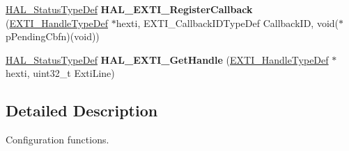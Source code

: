 \begin{DoxyCompactItemize}
\mbox{\hyperlink{stm32f7xx__hal__def_8h_a63c0679d1cb8b8c684fbb0632743478f}{H\+A\+L\+\_\+\+Status\+Type\+Def}} {\bfseries H\+A\+L\+\_\+\+E\+X\+T\+I\+\_\+\+Register\+Callback} (\mbox{\hyperlink{struct_e_x_t_i___handle_type_def}{E\+X\+T\+I\+\_\+\+Handle\+Type\+Def}} $\ast$hexti, E\+X\+T\+I\+\_\+\+Callback\+I\+D\+Type\+Def Callback\+ID, void($\ast$p\+Pending\+Cbfn)(void))
\item 
\mbox{\label{group___e_x_t_i___exported___functions___group1_gaa5856ee92dc1265db144af025673ee46}} 
\mbox{\hyperlink{stm32f7xx__hal__def_8h_a63c0679d1cb8b8c684fbb0632743478f}{H\+A\+L\+\_\+\+Status\+Type\+Def}} {\bfseries H\+A\+L\+\_\+\+E\+X\+T\+I\+\_\+\+Get\+Handle} (\mbox{\hyperlink{struct_e_x_t_i___handle_type_def}{E\+X\+T\+I\+\_\+\+Handle\+Type\+Def}} $\ast$hexti, uint32\+\_\+t Exti\+Line)
\end{DoxyCompactItemize}


\subsection{Detailed Description}
Configuration functions. 

